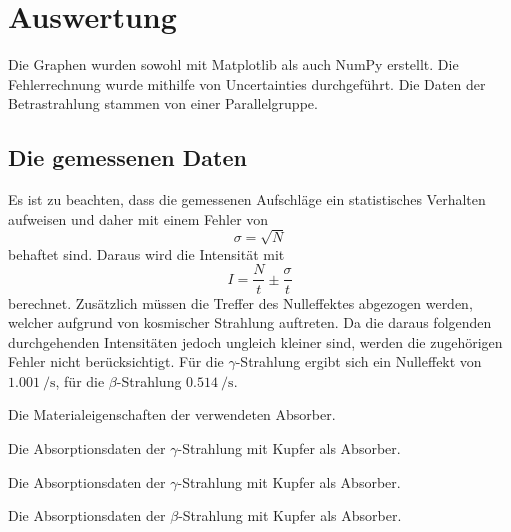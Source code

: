 \section{Auswertung}
\label{sec:Auswertung}


Die Graphen wurden sowohl mit Matplotlib \cite{matplotlib} als auch NumPy \cite{numpy} erstellt. Die
Fehlerrechnung wurde mithilfe von Uncertainties \cite{uncertainties} durchgeführt.
Die Daten der Betrastrahlung stammen von einer Parallelgruppe.
\subsection{Die gemessenen Daten}

Es ist zu beachten, dass die gemessenen Aufschläge ein statistisches Verhalten
aufweisen und daher mit einem Fehler von
\begin{equation}
\sigma = \sqrt{N}
\end{equation}
behaftet sind. Daraus wird die Intensität mit
\begin{equation}
  I = \frac{N}{t} \pm \frac{\sigma}{t}
\end{equation}
 berechnet. Zusätzlich müssen die Treffer des Nulleffektes abgezogen werden,
welcher aufgrund von kosmischer Strahlung auftreten. Da die daraus folgenden
durchgehenden Intensitäten jedoch ungleich kleiner sind, werden die zugehörigen
 Fehler nicht berücksichtigt. Für die $\gamma$-Strahlung ergibt sich ein
 Nulleffekt von $\SI{1.001}{\per\second}$, für die $\beta$-Strahlung $\SI{0.514}{\per\second}$.

 \begin{table}
  \centering
  \caption{Die Materialeigenschaften der verwendeten Absorber.}
  
  \label{tab:rohd}
 \end{table}

\begin{table}
 \centering
 \caption{Die Absorptionsdaten der $\gamma$-Strahlung mit Kupfer als Absorber.}
 
 \label{tab:k}
\end{table}

\begin{table}
 \centering
 \caption{Die Absorptionsdaten der $\gamma$-Strahlung mit Kupfer als Absorber.}
 
 \label{tab:e}
\end{table}

\begin{table}
 \centering
 \caption{Die Absorptionsdaten der $\beta$-Strahlung mit Kupfer als Absorber.}
 
 \label{tab:betaJ}
\end{table}

